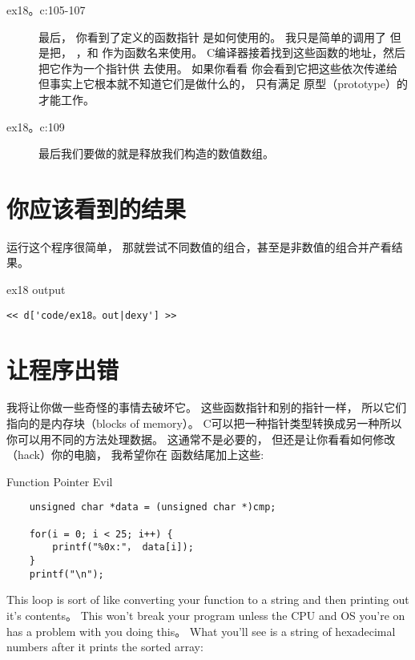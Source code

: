 \begin{description}
\item[ex18。c:105-107] 最后， 你看到了定义的函数指针 是如何使用的。 我只是简单的调用了  但是把， ，和
    作为函数名来使用。 C编译器接着找到这些函数的地址，然后把它作为一个指针供  去使用。 如果你看看 你会看到它把这些依次传递给 但事实上它根本就不知道它们是做什么的， 只有满足 原型（prototype）的才能工作。
\item[ex18。c:109] 最后我们要做的就是释放我们构造的数值数组。
\end{description}


\section{你应该看到的结果}

运行这个程序很简单， 那就尝试不同数值的组合，甚至是非数值的组合并产看结果。

\begin{code}{ex18 output}
\begin{lstlisting}
<< d['code/ex18。out|dexy'] >>
\end{lstlisting}
\end{code}


\section{让程序出错}

我将让你做一些奇怪的事情去破坏它。  这些函数指针和别的指针一样， 所以它们指向的是内存块（blocks of memory）。  C可以把一种指针类型转换成另一种所以你可以用不同的方法处理数据。  这通常不是必要的， 但还是让你看看如何修改（hack）你的电脑， 我希望你在  函数结尾加上这些:

\begin{code}{Function Pointer Evil}
\begin{lstlisting}
    unsigned char *data = (unsigned char *)cmp;

    for(i = 0; i < 25; i++) {
        printf("%0x:"， data[i]);
    }
    printf("\n");
\end{lstlisting}
\end{code}

This loop is sort of like converting your function to a string and then
printing out it's contents。  This won't break your program unless the CPU and
OS you're on has a problem with you doing this。  What you'll see is a string of
hexadecimal numbers after it prints the sorted array:

